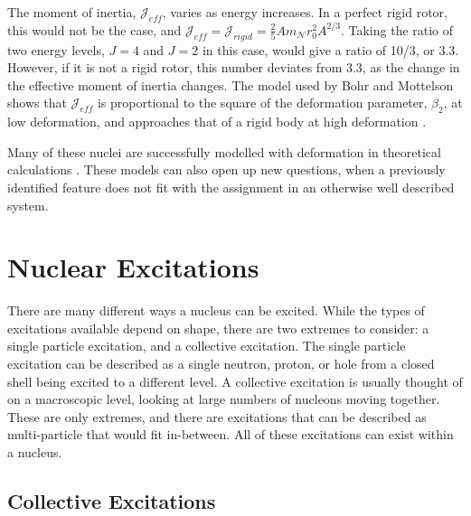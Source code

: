 The moment of inertia, $\mathscr{J}_{eff}$, varies as energy increases. In a perfect rigid rotor, this would not be the case, and $\mathscr{J}_{eff}=\mathscr{J}_{rigid}=\frac{2}{5}Am_{\mathscr{N}}r_0^2A^{2/3}$. Taking the ratio of two energy levels, $J=4$ and $J=2$ in this case, would give a ratio of 10/3, or 3.3. However, if it is not a rigid rotor, this number deviates from 3.3, as the change in the effective moment of inertia changes. The model used by Bohr and Mottelson shows that $\mathscr{J}_{eff}$ is proportional to the square of the deformation parameter, $\beta_2$, at low deformation, and approaches that of a rigid body at high deformation \citep{bohr55:_deformation}.



Many of these nuclei are successfully modelled with deformation in theoretical calculations \citep{delaroche10:_systematics}. These models can also open up new questions, when a previously identified feature does not fit with the assignment in an otherwise well described system.

\section{Nuclear Excitations}
\label{sec:nuc_excite}

There are many different ways a nucleus can be excited. While the types of excitations available depend on shape, there are two extremes to consider: a single particle excitation, and a collective excitation. The single particle excitation can be described as a single neutron, proton, or hole from a closed shell being excited to a different level. A collective excitation is usually thought of on a macroscopic level, looking at large numbers of nucleons moving together. These are only extremes, and there are excitations that can be described as multi-particle that would fit in-between. All of these excitations can exist within a nucleus.

\subsection{Collective Excitations}
\label{sec:nuc_collective}

